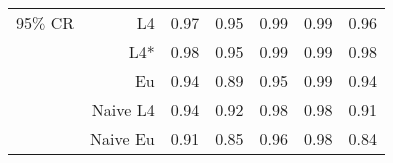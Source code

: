 \documentclass[a4paper,12pt,twoside]{book}
\begin{document}
\begin{table}[H]
\begin{tabular}{crrrrrr}
 {\color{blue} 95$\%$ CR } & L4  &0.97 & 0.95 & 0.99 & 0.99 & 0.96 \\ 
 
 &L4*  &  0.98 & 0.95 & 0.99 & 0.99 & 0.98 \\ 
 
&Eu &   0.94 & 0.89 & 0.95 & 0.99 & 0.94 \\ 
 
&Naive L4&  0.94 & 0.92 & 0.98 & 0.98 & 0.91 \\ 
 
&Naive Eu &     0.91 & 0.85 & 0.96 & 0.98 & 0.84 \\ 
  
\end{tabular}

\end{table}

\end{document}
